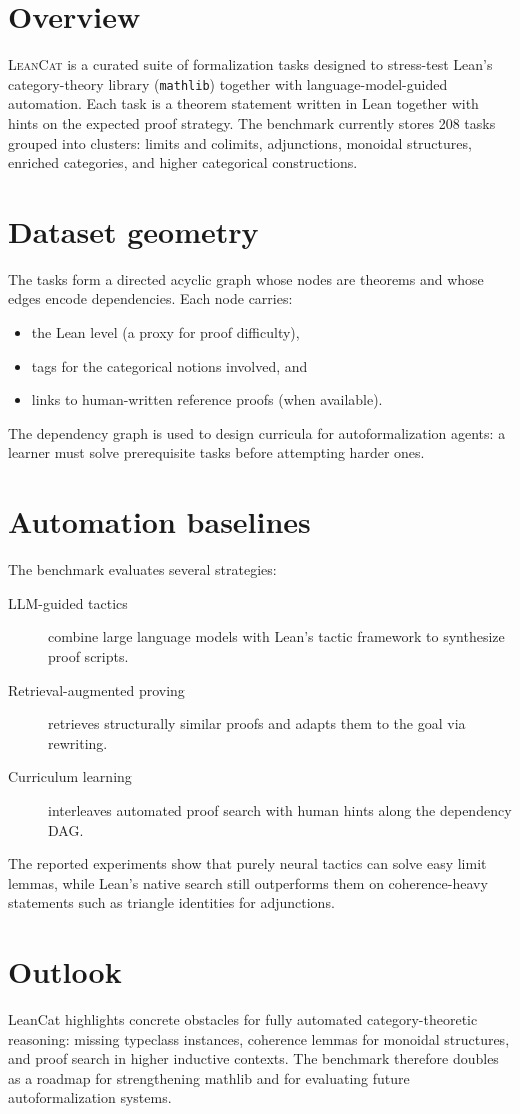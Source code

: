 \documentclass[12pt]{article}
\begin{document}
\section*{Overview}
\textsc{LeanCat} is a curated suite of formalization tasks designed to stress-test Lean's category-theory library (\texttt{mathlib}) together with language-model-guided automation.  Each task is a theorem statement written in Lean together with hints on the expected proof strategy.  The benchmark currently stores 208 tasks grouped into clusters: limits and colimits, adjunctions, monoidal structures, enriched categories, and higher categorical constructions.

\section*{Dataset geometry}
The tasks form a directed acyclic graph whose nodes are theorems and whose edges encode dependencies.  Each node carries:
\begin{itemize}
  \item the Lean level (a proxy for proof difficulty),
  \item tags for the categorical notions involved, and
  \item links to human-written reference proofs (when available).
\end{itemize}
The dependency graph is used to design curricula for autoformalization agents: a learner must solve prerequisite tasks before attempting harder ones.

\section*{Automation baselines}
The benchmark evaluates several strategies:
\begin{description}
  \item[LLM-guided tactics] combine large language models with Lean's tactic framework to synthesize proof scripts.
  \item[Retrieval-augmented proving] retrieves structurally similar proofs and adapts them to the goal via rewriting.
  \item[Curriculum learning] interleaves automated proof search with human hints along the dependency DAG.
\end{description}
The reported experiments show that purely neural tactics can solve easy limit lemmas, while Lean's native search still outperforms them on coherence-heavy statements such as triangle identities for adjunctions.

\section*{Outlook}
LeanCat highlights concrete obstacles for fully automated category-theoretic reasoning: missing typeclass instances, coherence lemmas for monoidal structures, and proof search in higher inductive contexts.  The benchmark therefore doubles as a roadmap for strengthening mathlib and for evaluating future autoformalization systems.
\end{document}
